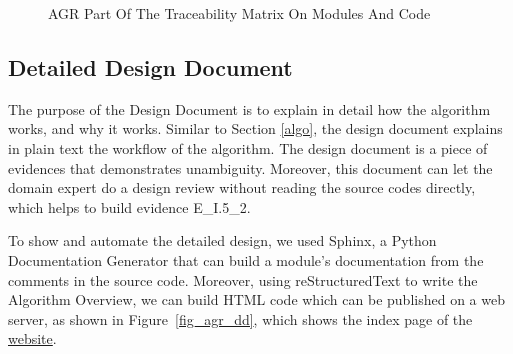 \begin{figure}[H]
    \centering
    \caption[AGR Part Of The Traceability Matrix On Modules And Code]{AGR Part Of The Traceability Matrix On Modules And Code}
    \label{fig_agr_mtm_modules_code}
\end{figure}

\subsection{Detailed Design Document}
The purpose of the Design Document \cite{DD} is to explain in detail how the algorithm works, and why it works. Similar to Section \ref{algo}, the design document explains in plain text the workflow of the algorithm. The design document is a piece of evidences that demonstrates unambiguity. Moreover, this document can let the domain expert do a design review  without reading the source codes directly,  which helps to build evidence E\_I.5\_2.

To show and automate the detailed design, we used Sphinx, a Python Documentation Generator that can build a module's documentation from the comments in the source code. Moreover, using reStructuredText to write the Algorithm Overview, we can build HTML code which can be published on a web server, as shown in Figure~\ref{fig_agr_dd}, which shows the index page of the \href{https://joviel25.github.io/AortaGR-design-document/index.html}{website}. 

